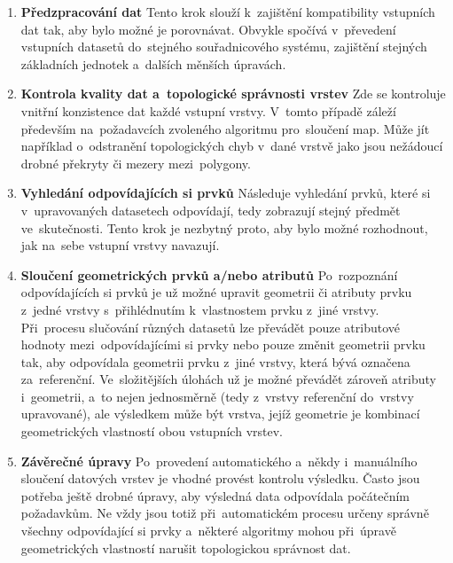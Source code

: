 \begin{enumerate}
  \item \textbf{Předzpracování dat}
    \subitem Tento krok slouží k~zajištění kompatibility vstupních dat tak, 
      aby bylo možné je porovnávat. Obvykle spočívá v~převedení vstupních 
      datasetů do~stejného souřadnicového systému, zajištění stejných 
      základních jednotek a~dalších měnších úpravách. 
  \item \textbf{Kontrola kvality dat a~topologické správnosti vrstev}
    \subitem Zde se kontroluje vnitřní konzistence dat každé vstupní vrstvy.
      V~tomto případě záleží především na~požadavcích zvoleného algoritmu 
      pro~sloučení map. Může jít například o~odstranění topologických chyb 
      v~dané vrstvě jako jsou nežádoucí drobné překryty či mezery 
      mezi~polygony.
  \item \textbf{Vyhledání odpovídajících si prvků}
      \subitem Následuje vyhledání prvků, které si v~upravovaných datasetech
      odpovídají, tedy zobrazují stejný předmět ve~skutečnosti. Tento krok je 
      nezbytný proto, aby bylo možné rozhodnout, jak na~sebe vstupní vrstvy 
      navazují.
  \item \textbf{Sloučení geometrických prvků a/nebo atributů}
      \subitem Po~rozpoznání odpovídajících si prvků je už možné upravit 
      geometrii či atributy prvku z~jedné vrstvy s~přihlédnutím k~vlastnostem 
      prvku z~jiné vrstvy. Při~procesu slučování různých datasetů lze převádět 
      pouze atributové hodnoty mezi~odpovídajícími si prvky nebo pouze změnit 
      geometrii prvku tak, aby odpovídala geometrii prvku z~jiné vrstvy, která 
      bývá označena za~referenční. Ve~slo\-ži\-tějších úlohách už je možné převádět
      zároveň atributy i~geometrii, a~to nejen jednosměrně (tedy z~vrstvy
      referenční do~vrstvy upravované), ale výsledkem může být vrstva, jejíž 
      geometrie je kombinací geometrických vlastností obou vstupních vrstev.
  \item \textbf{Závěrečné úpravy}
      \subitem Po~provedení automatického a~někdy i~manuálního sloučení datových
      vrstev je vhodné provést kontrolu výsledku. Často jsou potřeba ještě drobné
      úpravy, aby výsledná data odpovídala počátečním požadavkům. Ne vždy jsou 
      totiž při~automatickém procesu určeny správně všechny odpovídající si prvky
      a~některé algoritmy mohou při~úpravě geometrických vlastností narušit 
      topologickou správnost dat.
\end{enumerate}


